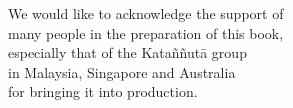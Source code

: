 
\thispagestyle{empty}

\vspace*{4\baselineskip}

{\centering

\begin{minipage}{0.9\linewidth}
\centering\small
We would like to acknowledge the support of\\
many people in the preparation of this book,\\
especially that of the Kataññutā group\\
in Malaysia, Singapore and Australia\\
for bringing it into production.

\end{minipage}

}

